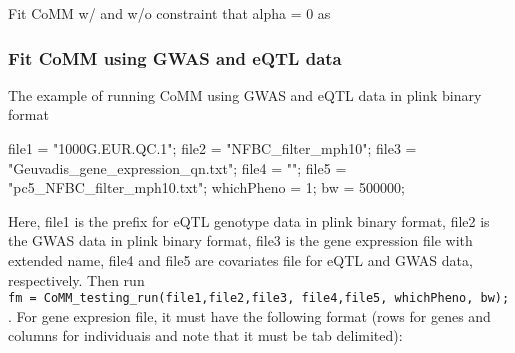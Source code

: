 \documentclass[]{article}
\newenvironment{Shaded}{\begin{snugshade}}{\end{snugshade}}
\newcommand{\KeywordTok}[1]{\textcolor[rgb]{0.13,0.29,0.53}{\textbf{#1}}}
\newcommand{\DataTypeTok}[1]{\textcolor[rgb]{0.13,0.29,0.53}{#1}}
\newcommand{\DecValTok}[1]{\textcolor[rgb]{0.00,0.00,0.81}{#1}}
\newcommand{\StringTok}[1]{\textcolor[rgb]{0.31,0.60,0.02}{#1}}
\newcommand{\OperatorTok}[1]{\textcolor[rgb]{0.81,0.36,0.00}{\textbf{#1}}}
\newcommand{\NormalTok}[1]{#1}
\begin{document}
Fit CoMM w/ and w/o constraint that alpha = 0 as

\begin{Shaded}
\end{Shaded}

\subsubsection{Fit CoMM using GWAS and eQTL
data}\label{fit-comm-using-gwas-and-eqtl-data}

The example of running CoMM using GWAS and eQTL data in plink binary
format

\begin{Shaded}
\begin{Highlighting}[]
\NormalTok{file1 =}\StringTok{ "1000G.EUR.QC.1"}\NormalTok{;}
\NormalTok{file2 =}\StringTok{ "NFBC_filter_mph10"}\NormalTok{;}
\NormalTok{file3 =}\StringTok{ "Geuvadis_gene_expression_qn.txt"}\NormalTok{;}
\NormalTok{file4 =}\StringTok{ ""}\NormalTok{;}
\NormalTok{file5 =}\StringTok{ "pc5_NFBC_filter_mph10.txt"}\NormalTok{;}
\NormalTok{whichPheno =}\StringTok{ }\DecValTok{1}\NormalTok{;}
\NormalTok{bw =}\StringTok{ }\DecValTok{500000}\NormalTok{;}
\end{Highlighting}
\end{Shaded}

Here, file1 is the prefix for eQTL genotype data in plink binary format,
file2 is the GWAS data in plink binary format, file3 is the gene
expression file with extended name, file4 and file5 are covariates file
for eQTL and GWAS data, respectively. Then run
\texttt{fm\ =\ CoMM\_testing\_run(file1,file2,file3,\ file4,file5,\ whichPheno,\ bw);}.
For gene expresion file, it must have the following format (rows for
genes and columns for individuais and note that it must be tab
delimited):
\end{document}
